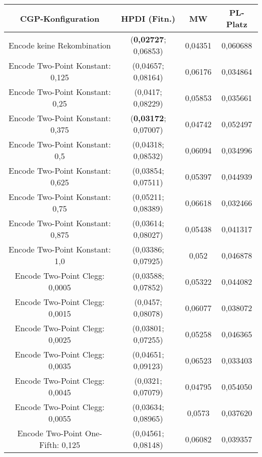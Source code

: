 \begin{table}[H]
	\centering
	\begin{tabular}{c | c | c | c}
		\textbf{CGP-Konfiguration} & \textbf{HPDI (Fitn.)} & \textbf{MW} & \textbf{PL-Platz}\\
		\hline
		Encode keine Rekombination & (\textbf{0,02727}; 0,06853) & \color{Green}0,04351\color{black} & \color{Green}0,060688\color{black}\\
		\hline
		\hline
		Encode Two-Point Konstant: 0,125 & (0,04657; 0,08164) & \color{red}0,06176\color{black} & \color{red}0,034864\color{black}\\
		\hline
		Encode Two-Point Konstant: 0,25 & (0,0417; 0,08229) & 0,05853 & 0,035661\\
		\hline
		Encode Two-Point Konstant: 0,375 & (\textbf{0,03172}; 0,07007) & \color{Green}0,04742\color{black} & 0,052497\\
		\hline
		Encode Two-Point Konstant: 0,5 & (0,04318; 0,08532) & 0,06094 & 0,034996\\
		\hline
		Encode Two-Point Konstant: 0,625 & (0,03854; 0,07511) & 0,05397 & 0,044939\\
		\hline
		Encode Two-Point Konstant: 0,75 & \color{Green}(0,05211; 0,08389)\color{black} & \color{red}0,06618\color{black} & \color{red}0,032466\color{black}\\
		\hline
		Encode Two-Point Konstant: 0,875 & \color{red}(0,03614; 0,08027)\color{black} & 0,05438 & 0,041317\\
		\hline
		Encode Two-Point Konstant: 1,0 & \color{red}(0,03386; 0,07925)\color{black} & 0,052 & 0,046878\\
		\hline
		\hline
		Encode Two-Point Clegg: 0,0005 & (0,03588; 0,07852) & 0,05322 & 0,044082\\
		\hline
		Encode Two-Point Clegg: 0,0015 & (0,0457; 0,08078) & 0,06077 & 0,038072\\
		\hline
		Encode Two-Point Clegg: 0,0025 & (0,03801; 0,07255) & 0,05258 & 0,046365\\
		\hline
		Encode Two-Point Clegg: 0,0035 & (0,04651; 0,09123) & \color{red}0,06523\color{black} & \color{red}0,033403\color{black}\\
		\hline
		Encode Two-Point Clegg: 0,0045 & (0,0321; 0,07079) &\color{Green} 0,04795\color{black} &\color{Green} 0,054050\color{black}\\
		\hline
		Encode Two-Point Clegg: 0,0055 & \color{red}(0,03634; 0,08965)\color{black} & 0,0573 & 0,037620\\
		\hline
		\hline
		Encode Two-Point One-Fifth: 0,125 & (0,04561; 0,08148) & 0,06082 & 0,039357\\

\end{tabular}
\end{table}
